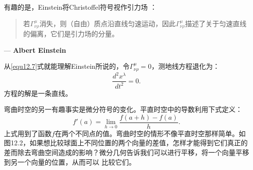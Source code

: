 有趣的是，Einstein将Christoffel符号视作引力场%
%
：
\begin{quote}
若$\Gamma^\mu_{\nu \rho}$消失，则（自由）质点沿直线匀速运动，因此$\Gamma^\mu_{\nu \rho}$描述了关于匀速直线的偏离，它们是引力场的分量。
\end{quote}
\begin{flushright}
--- {\bfseries Albert Einstein}
\end{flushright}
从\ref{equ12.7}式就能理解Einstein所说的，令$\Gamma^\mu_{\nu \rho} = 0$，测地线方程退化为：
\begin{equation}
\label{equ12.8}
    \frac{d^2 x^\lambda}{dt^2} = 0.
\end{equation}
方程的解是一条直线。

弯曲时空的另一有趣事实是微分符号的变化。平直时空中的导数利用下式定义：
\begin{equation}
\label{equ12.9}
    f'(a) = \lim_{h \to 0} \frac{f(a + h) - f(a)}{h}.
\end{equation}
上式用到了函数$f$在两个不同点的值。弯曲时空的情形不像平直时空那样简单。如图12.2，如果想比较球面上不同位置的两个向量的差值，怎样才能得到它们真正的差而除去弯曲空间造成的影响？微分几何告诉我们可以进行平移，将一个向量平移到另一个向量的位置，从而可以%
%
比较它们。


